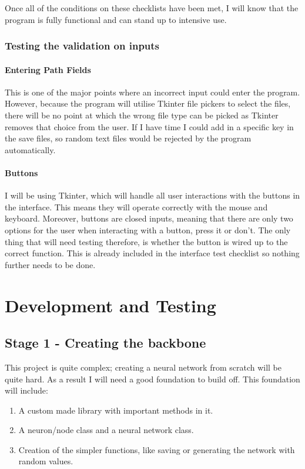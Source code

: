 \documentclass{report}
\begin{document}
Once all of the conditions on these checklists have been met, I will know that the program is fully functional and can stand up to intensive use.
\newpage

\subsection{Testing the validation on inputs}

\subsubsection{Entering Path Fields}
This is one of the major points where an incorrect input could enter the program. However, because the program will utilise Tkinter file pickers to select the files, there will be no point at which the wrong file type can be picked as Tkinter removes that choice from the user. If I have time I could add in a specific key in the save files, so random text files would be rejected by the program automatically.

\subsubsection{Buttons}
I will be using Tkinter, which will handle all user interactions with the buttons in the interface. This means they will operate correctly with the mouse and keyboard. Moreover, buttons are closed inputs, meaning that there are only two options for the user when interacting with a button, press it or don't. The only thing that will need testing therefore, is whether the button is wired up to the correct function. This is already included in the interface test checklist so nothing further needs to be done.



\newpage
\chapter{Development and Testing}

\section{Stage 1 - Creating the backbone}
This project is quite complex; creating a neural network from scratch will be quite hard. As a result I will need a good foundation to build off. This foundation will include:
\begin{enumerate}
    \item A custom made library with important methods in it.
    \item A neuron/node class and a neural network class.
    \item Creation of the simpler functions, like saving or generating the network with random values.
\end{enumerate}
\end{document}
